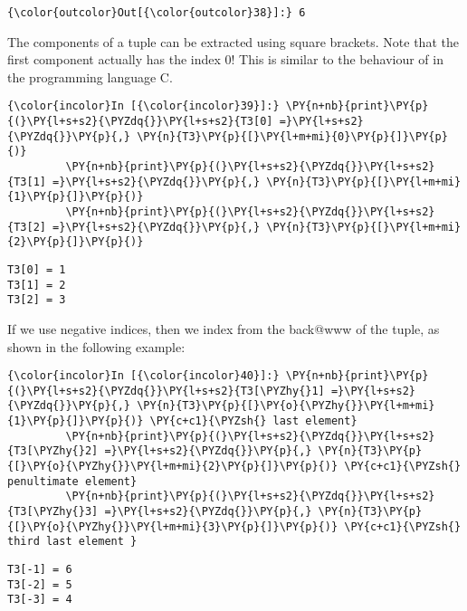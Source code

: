 \begin{Verbatim}[commandchars=\\\{\}]
{\color{outcolor}Out[{\color{outcolor}38}]:} 6
\end{Verbatim}
            
The components of a tuple can be extracted using square brackets. Note
that the first component actually has the index \(0\)! This is similar
to the behaviour of  in the programming language C.

\begin{Verbatim}[commandchars=\\\{\}]
{\color{incolor}In [{\color{incolor}39}]:} \PY{n+nb}{print}\PY{p}{(}\PY{l+s+s2}{\PYZdq{}}\PY{l+s+s2}{T3[0] =}\PY{l+s+s2}{\PYZdq{}}\PY{p}{,} \PY{n}{T3}\PY{p}{[}\PY{l+m+mi}{0}\PY{p}{]}\PY{p}{)}
         \PY{n+nb}{print}\PY{p}{(}\PY{l+s+s2}{\PYZdq{}}\PY{l+s+s2}{T3[1] =}\PY{l+s+s2}{\PYZdq{}}\PY{p}{,} \PY{n}{T3}\PY{p}{[}\PY{l+m+mi}{1}\PY{p}{]}\PY{p}{)}
         \PY{n+nb}{print}\PY{p}{(}\PY{l+s+s2}{\PYZdq{}}\PY{l+s+s2}{T3[2] =}\PY{l+s+s2}{\PYZdq{}}\PY{p}{,} \PY{n}{T3}\PY{p}{[}\PY{l+m+mi}{2}\PY{p}{]}\PY{p}{)}
\end{Verbatim}

\begin{Verbatim}[commandchars=\\\{\}]
T3[0] = 1
T3[1] = 2
T3[2] = 3
\end{Verbatim}
If we use negative indices, then we index from the back@www of the tuple, as
shown in the following example:

\begin{Verbatim}[commandchars=\\\{\}]
{\color{incolor}In [{\color{incolor}40}]:} \PY{n+nb}{print}\PY{p}{(}\PY{l+s+s2}{\PYZdq{}}\PY{l+s+s2}{T3[\PYZhy{}1] =}\PY{l+s+s2}{\PYZdq{}}\PY{p}{,} \PY{n}{T3}\PY{p}{[}\PY{o}{\PYZhy{}}\PY{l+m+mi}{1}\PY{p}{]}\PY{p}{)} \PY{c+c1}{\PYZsh{} last element}
         \PY{n+nb}{print}\PY{p}{(}\PY{l+s+s2}{\PYZdq{}}\PY{l+s+s2}{T3[\PYZhy{}2] =}\PY{l+s+s2}{\PYZdq{}}\PY{p}{,} \PY{n}{T3}\PY{p}{[}\PY{o}{\PYZhy{}}\PY{l+m+mi}{2}\PY{p}{]}\PY{p}{)} \PY{c+c1}{\PYZsh{} penultimate element}
         \PY{n+nb}{print}\PY{p}{(}\PY{l+s+s2}{\PYZdq{}}\PY{l+s+s2}{T3[\PYZhy{}3] =}\PY{l+s+s2}{\PYZdq{}}\PY{p}{,} \PY{n}{T3}\PY{p}{[}\PY{o}{\PYZhy{}}\PY{l+m+mi}{3}\PY{p}{]}\PY{p}{)} \PY{c+c1}{\PYZsh{} third last element }
\end{Verbatim}

\begin{Verbatim}[commandchars=\\\{\}]
T3[-1] = 6
T3[-2] = 5
T3[-3] = 4
\end{Verbatim}

